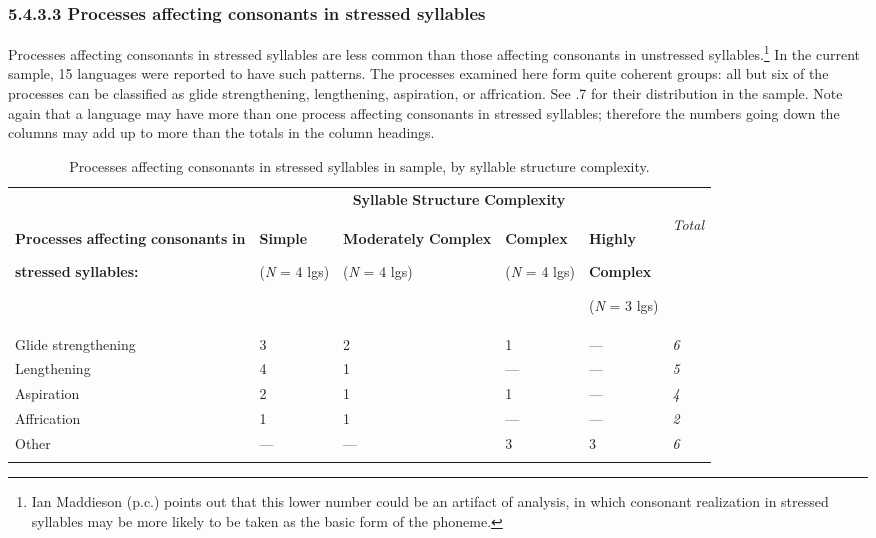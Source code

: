 \subsubsection{\textbf{5.4.3.3} \textbf{Processes} \textbf{affecting} \textbf{consonants} \textbf{in} \textbf{stressed} \textbf{syllables}}

  Processes affecting consonants in stressed syllables are less common than those affecting consonants in unstressed syllables.\footnote{ \textrm{Ian Maddieson (p.c.) points out that this lower number could be an artifact of analysis, in which consonant realization in stressed syllables may be more likely to be taken as the basic form of the phoneme.}} In the current sample, 15 languages were reported to have such patterns. The processes examined here form quite coherent groups: all but six of the processes can be classified as glide strengthening, lengthening, aspiration, or affrication. See .7 for their distribution in the sample. Note again that a language may have more than one process affecting consonants in stressed syllables; therefore the numbers going down the columns may add up to more than the totals in the column headings.

\begin{table}
\begin{tabularx}{\textwidth}{XXXXXX}
\lsptoprule
 & \multicolumn{4}{c}{ \textbf{Syllable} \textbf{Structure} \textbf{Complexity}} & \\
{ \textbf{Processes} \textbf{affecting} \textbf{consonants} \textbf{in} }

 \textbf{stressed} \textbf{syllables:} & { \textbf{Simple}}

 (\textit{N} = 4 lgs) & { \textbf{Moderately} \textbf{Complex}}

 (\textit{N} = 4 lgs) & { \textbf{Complex}}

 (\textit{N} = 4 lgs) & { \textbf{Highly} }

{ \textbf{Complex}}

 (\textit{N} = 3 lgs) & \textit{Total}\\
 Glide strengthening & 3 & 2 & 1 & — & \textit{6}\\
 Lengthening & 4 & 1 & — & — & \textit{5}\\
 Aspiration & 2 & 1 & 1 & — & \textit{4}\\
 Affrication & 1 & 1 & — & — & \textit{2}\\
 Other & — & — & 3 & 3 & \textit{6}\\
\lspbottomrule
\end{tabularx}
\caption{\label{5.7}Processes affecting consonants in stressed syllables in sample, by syllable structure complexity.}
\end{table}

